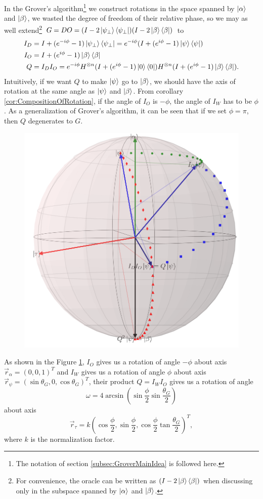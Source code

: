 \documentclass[a4paper,10pt]{book}
\numberwithin{equation}{section}
\begin{document}
In the Grover's algorithm\footnote{The notation of section \ref{subsec:GroverMainIdea} is followed here.} we construct rotations in the space spanned by $\ket{\alpha}$ and $\ket{\beta}$, we wasted the degree of freedom of their relative phase, so we may as well extend\footnote{For convenience, the oracle can be written as $(I-2\ket{\beta}\bra{\beta})$ when discussing only in the subspace spanned by $\ket{\alpha}$ and $\ket{\beta}$.} $G=DO=(I-2\ket{\psi_{\perp}}\bra{\psi_{\perp}})(I-2\ket{\beta}\bra{\beta})$ to
\begin{equation}
    \begin{split}
        I_{D} & = I+(e^{-i\phi}-1)\ket{\psi_{\perp}}\bra{\psi_{\perp}} = e^{-i\phi}(I+(e^{i\phi}-1)\ket{\psi}\bra{\psi})                   \\
        I_{O} & = I+(e^{i\phi}-1)\ket{\beta}\bra{\beta}                                                                                    \\
        Q     & = I_{D}I_{O} = e^{-i\phi}H^{\otimes n}(I+(e^{i\phi}-1)\ket{0}\bra{0})H^{\otimes n}(I+(e^{i\phi}-1)\ket{\beta}\bra{\beta}).
    \end{split}
\end{equation}
Intuitively, if we want $Q$ to make $\ket{\psi}$ go to $\ket{\beta}$, we should have the axis of rotation at the same angle as $\ket{\psi}$ and $\ket{\beta}$. From corollary \ref{cor:CompositionOfRotation}, if the angle of $I_{O}$ is $-\phi$, the angle of $I_{W}$ has to be $\phi$. As a generalization of Grover's algorithm, it can be seen that if we set $\phi=\pi$, then $Q$ degenerates to $G$.
\begin{figure}[h]
    \centering
    \includegraphics[width=0.5\columnwidth]{figures/Long.png}
    \caption{}
    \label{fig:long}
\end{figure}

As shown in the Figure \ref{fig:long}, $I_{O}$ gives us a rotation of angle $-\phi$ about axis $\vec{r}_{\alpha}=(0,0,1)^{T}$ and $I_{W}$ gives us a rotation of angle $\phi$ about axis $\vec{r}_{\psi}=(\sin\theta_{G},0,\cos\theta_{G})^{T}$, their product $Q=I_{W}I_{O}$ gives us a rotation of angle
\begin{equation}
    \omega=4\arcsin(\sin\frac{\phi}{2}\sin\frac{\theta_{G}}{2})
\end{equation}
about axis
\begin{equation}
    \vec{r}_{\tau}= k(\cos\frac{\phi}{2},\sin\frac{\phi}{2},\cos\frac{\phi}{2}\tan\frac{\theta_{G}}{2})^{T},
\end{equation}
where $k$ is the normalization factor.
\end{document}
